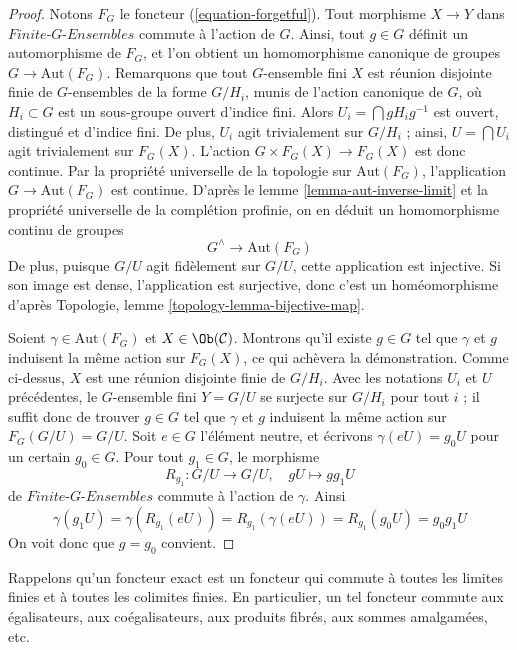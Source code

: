 \begin{proof}
Notons $F_G$ le foncteur (\ref{equation-forgetful}). Tout morphisme
$X \to Y$ dans $\textit{Finite-}G\textit{-Ensembles}$ commute à l'action de $G$.
Ainsi, tout $g \in G$ définit un automorphisme de $F_G$, et l'on obtient un
homomorphisme canonique de groupes $G \to \text{Aut}(F_G)$.
Remarquons que tout $G$-ensemble fini $X$ est réunion disjointe finie de
$G$-ensembles de la forme $G/H_i$, munis de l'action canonique de $G$, où
$H_i \subset G$ est un sous-groupe ouvert d'indice fini. Alors
$U_i = \bigcap gH_ig^{-1}$ est ouvert, distingué et d'indice fini.
De plus, $U_i$ agit trivialement sur $G/H_i$ ; ainsi,
$U = \bigcap U_i$ agit trivialement sur $F_G(X)$. L'action
$G \times F_G(X) \to F_G(X)$ est donc continue. Par la propriété universelle
de la topologie sur $\text{Aut}(F_G)$, l'application
$G \to \text{Aut}(F_G)$ est continue.
D'après le lemme \ref{lemma-aut-inverse-limit} et la propriété universelle
de la complétion profinie, on en déduit un homomorphisme continu de groupes
$$
G^\wedge \longrightarrow \text{Aut}(F_G)
$$
De plus, puisque $G/U$ agit fidèlement sur $G/U$, cette application est
injective. Si son image est dense, l'application est surjective, donc c'est
un homéomorphisme d'après Topologie, lemme
\ref{topology-lemma-bijective-map}.

\medskip\noindent
Soient $\gamma \in \text{Aut}(F_G)$ et $X \in \Ob(\mathcal{C})$.
Montrons qu'il existe $g \in G$ tel que $\gamma$ et $g$ induisent la même
action sur $F_G(X)$, ce qui achèvera la démonstration. Comme ci-dessus,
$X$ est une réunion disjointe finie de $G/H_i$. Avec les notations $U_i$ et
$U$ précédentes, le $G$-ensemble fini $Y = G/U$ se surjecte sur $G/H_i$ pour
tout $i$ ; il suffit donc de trouver $g \in G$ tel que $\gamma$ et $g$
induisent la même action sur $F_G(G/U) = G/U$. Soit $e \in G$ l'élément
neutre, et écrivons $\gamma(eU) = g_0U$ pour un certain $g_0 \in G$.
Pour tout $g_1 \in G$, le morphisme
$$
R_{g_1} : G/U \longrightarrow G/U,\quad gU \longmapsto gg_1U
$$
de $\textit{Finite-}G\textit{-Ensembles}$ commute à l'action de $\gamma$. Ainsi
$$
\gamma(g_1U) = \gamma(R_{g_1}(eU)) = R_{g_1}(\gamma(eU)) =
R_{g_1}(g_0U) = g_0g_1U
$$
On voit donc que $g = g_0$ convient.
\end{proof}

\noindent
Rappelons qu'un foncteur exact est un foncteur qui commute à toutes les
limites finies et à toutes les colimites finies. En particulier, un tel
foncteur commute aux égalisateurs, aux coégalisateurs, aux produits fibrés,
aux sommes amalgamées, etc.

